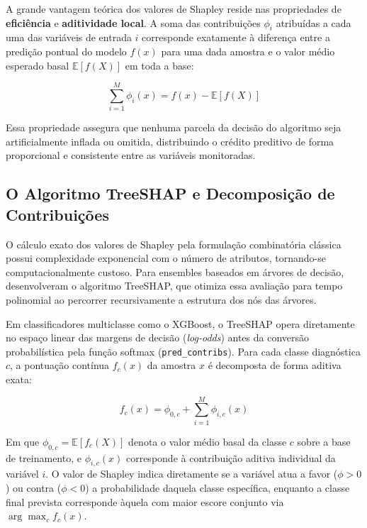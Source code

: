 A grande vantagem teórica dos valores de Shapley reside nas propriedades de \textbf{eficiência} e \textbf{aditividade local}. A soma das contribuições $\phi_i$ atribuídas a cada uma das variáveis de entrada $i$ corresponde exatamente à diferença entre a predição pontual do modelo $f(x)$ para uma dada amostra e o valor médio esperado basal $\mathbb{E}[f(X)]$ em toda a base:

\begin{equation}\label{eq:shapley_additivity}
\sum_{i=1}^{M} \phi_i(x) = f(x) - \mathbb{E}[f(X)]
\end{equation}

Essa propriedade assegura que nenhuma parcela da decisão do algoritmo seja artificialmente inflada ou omitida, distribuindo o crédito preditivo de forma proporcional e consistente entre as variáveis monitoradas.

\subsection{O Algoritmo TreeSHAP e Decomposição de Contribuições}\label{sec:treeshap}

O cálculo exato dos valores de Shapley pela formulação combinatória clássica possui complexidade exponencial com o número de atributos, tornando-se computacionalmente custoso. Para ensembles baseados em árvores de decisão,  desenvolveram o algoritmo TreeSHAP, que otimiza essa avaliação para tempo polinomial ao percorrer recursivamente a estrutura dos nós das árvores.

Em classificadores multiclasse como o XGBoost, o TreeSHAP opera diretamente no espaço linear das margens de decisão (\textit{log-odds}) antes da conversão probabilística pela função softmax (\texttt{pred\_contribs}). Para cada classe diagnóstica $c$, a pontuação contínua $f_c(x)$ da amostra $x$ é decomposta de forma aditiva exata:

\begin{equation}\label{eq:treeshap_add}
f_c(x) = \phi_{0,c} + \sum_{i=1}^{M} \phi_{i,c}(x)
\end{equation}

Em que $\phi_{0,c} = \mathbb{E}[f_c(X)]$ denota o valor médio basal da classe $c$ sobre a base de treinamento, e $\phi_{i,c}(x)$ corresponde à contribuição aditiva individual da variável $i$. O valor de Shapley indica diretamente se a variável atua a favor ($\phi > 0$) ou contra ($\phi < 0$) a probabilidade daquela classe específica, enquanto a classe final prevista corresponde àquela com maior escore conjunto via $\arg\max_c f_c(x)$.

